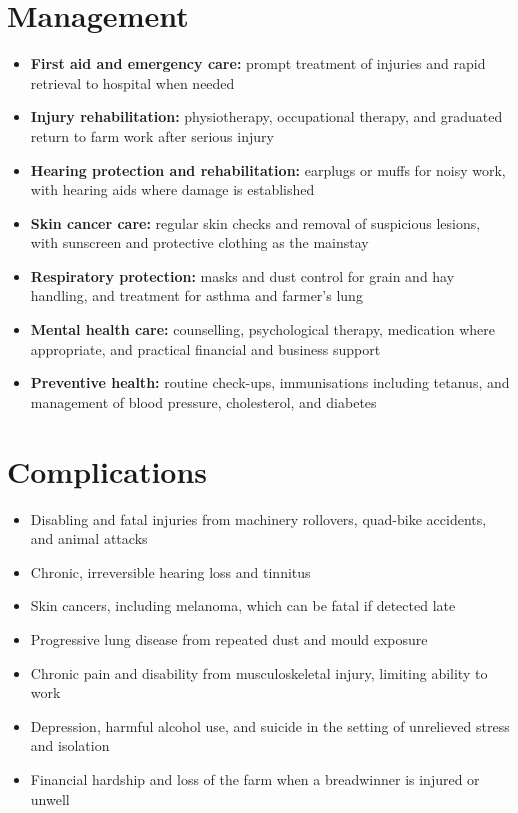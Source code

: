 \section*{Management}
\begin{itemize}
    \item \textbf{First aid and emergency care:} prompt treatment of injuries and rapid retrieval to hospital when needed
    \item \textbf{Injury rehabilitation:} physiotherapy, occupational therapy, and graduated return to farm work after serious injury
    \item \textbf{Hearing protection and rehabilitation:} earplugs or muffs for noisy work, with hearing aids where damage is established
    \item \textbf{Skin cancer care:} regular skin checks and removal of suspicious lesions, with sunscreen and protective clothing as the mainstay
    \item \textbf{Respiratory protection:} masks and dust control for grain and hay handling, and treatment for asthma and farmer's lung
    \item \textbf{Mental health care:} counselling, psychological therapy, medication where appropriate, and practical financial and business support
    \item \textbf{Preventive health:} routine check-ups, immunisations including tetanus, and management of blood pressure, cholesterol, and diabetes
\end{itemize}

\section*{Complications}
\begin{itemize}
    \item Disabling and fatal injuries from machinery rollovers, quad-bike accidents, and animal attacks
    \item Chronic, irreversible hearing loss and tinnitus
    \item Skin cancers, including melanoma, which can be fatal if detected late
    \item Progressive lung disease from repeated dust and mould exposure
    \item Chronic pain and disability from musculoskeletal injury, limiting ability to work
    \item Depression, harmful alcohol use, and suicide in the setting of unrelieved stress and isolation
    \item Financial hardship and loss of the farm when a breadwinner is injured or unwell
\end{itemize}

